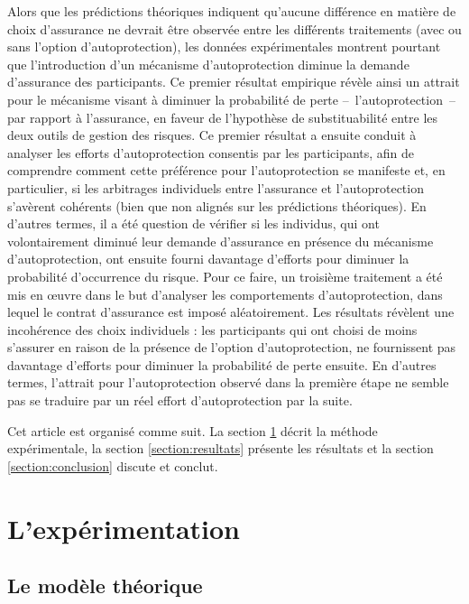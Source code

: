 \begin{Article}
\begin{refsection}[Mouminoux]
Alors que les prédictions théoriques indiquent qu'aucune différence en matière de choix d'assurance ne devrait être observée entre les différents traitements (avec ou sans l'option d'autoprotection), les données expérimentales montrent pourtant que l'introduction d'un mécanisme d'autoprotection diminue la demande d'assurance des participants. Ce premier résultat empirique révèle ainsi un attrait pour le mécanisme visant à diminuer la probabilité de perte --~l'autoprotection~-- par rapport à l'assurance, en faveur de l'hypothèse de substituabilité entre les deux outils de gestion des risques. Ce premier résultat a ensuite conduit à analyser les efforts d'autoprotection consentis par les participants, afin de comprendre comment cette préférence pour l'autoprotection se manifeste et, en particulier, si les arbitrages individuels entre l'assurance et l'autoprotection s'avèrent cohérents (bien que non alignés sur les prédictions théoriques). En d'autres termes, il a été question de vérifier si les individus, qui ont volontairement diminué leur demande d'assurance en présence du mécanisme d'autoprotection, ont ensuite fourni davantage d'efforts pour diminuer la probabilité d'occurrence du risque. Pour ce faire, un troisième traitement a été mis en \oe uvre dans le but d'analyser les comportements d'autoprotection, dans lequel le contrat d'assurance est imposé aléatoirement. Les résultats révèlent une incohérence des choix individuels : les participants qui ont choisi de moins s'assurer en raison de la présence de l'option d'autoprotection, ne fournissent pas davantage d'efforts pour diminuer la probabilité de perte ensuite. En d'autres termes, l'attrait pour l'autoprotection observé dans la première étape ne semble pas se traduire par un réel effort d'autoprotection par la suite. 

Cet article est organisé comme suit. La section \ref{section:experimentation} décrit la méthode expérimentale, la section \ref{section:resultats} présente les résultats et la section \ref{section:conclusion} discute et conclut. \\


\section{L'expérimentation}
\label{section:experimentation}

\subsection{Le modèle théorique}


\end{refsection}
\end{Article}
